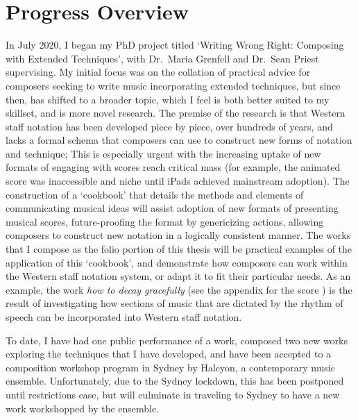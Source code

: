 \section{Progress Overview}
In July 2020, I began my PhD project titled `Writing Wrong Right: Composing with Extended Techniques', with Dr.\ Maria Grenfell and Dr.\ Sean Priest supervising.
My initial focus was on the collation of practical advice for composers seeking to write music incorporating extended techniques, but since then, has shifted to a broader topic, which I feel is both better suited to my skillset, and is more novel research.
The premise of the research is that Western staff notation has been developed piece by piece, over hundreds of years, and lacks a formal schema that composers can use to construct new forms of notation and technique; 
This is especially urgent with the increasing uptake of new formats of engaging with scores reach critical mass (for example, the animated score was inaccessible and niche until iPads achieved mainstream adoption).
The construction of a `cookbook' that details the methods and elements of communicating musical ideas will assist adoption of new formats of presenting musical scores, future-proofing the format by genericizing actions, allowing composers to construct new notation in a logically consistent manner.
The works that I compose as the folio portion of this thesis will be practical examples of the application of this `cookbook', and demonstrate how composers can work within the Western staff notation system, or adapt it to fit their particular needs.
As an example, the work \emph{how to decay gracefully} (see 
the appendix for the score
) is the result of investigating how sections of music that are dictated by the rhythm of speech can be incorporated into Western staff notation.

To date, I have had one public performance of a work, composed two new works exploring the techniques that I have developed, and have been accepted to a composition workshop program in Sydney by Halcyon, a contemporary music ensemble.
Unfortunately, due to the Sydney lockdown, this has been postponed until restrictions ease, but will culminate in traveling to Sydney to have a new work workshopped by the ensemble. 
